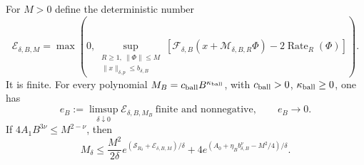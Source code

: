 \begin{proposition}
  \label{P:signed-moment-bulk-tail}
  For $M>0$ define the deterministic number
  \[
    \mathcal E_{\delta,B,M}=
    \max\left(0,\sup_{\substack{R\ge1,\ \|\Phi\|\le M\\
    \|x\|_{\delta,p}\le b_{\delta,B}}}
    [\mathcal F_{\delta,B}(x+\mathcal M_{\delta,B,R}\Phi)
    -2\operatorname{Rate}_R(\Phi)]\right).
  \]
  It is finite. For every polynomial
  $M_B=c_{\rm ball}B^{\kappa_{\rm ball}}$, with $c_{\rm ball}>0$,
  $\kappa_{\rm ball}\ge0$, one has
  \begin{equation}\label{E:signed-error-limit}
    e_B:=\limsup_{\delta\downarrow0}\mathcal E_{\delta,B,M_B}
    \ \text{finite and nonnegative},\qquad e_B\longrightarrow0 .
  \end{equation}
  If $4A_1B^{3\nu}\le M^{2-\nu}$, then
  \begin{equation}\label{E:signed-finite-moment}
    M_\delta\le
    \frac{M^2}{2\delta}
    e^{(\mathcal S_{R_\delta}+\mathcal E_{\delta,B,M})/\delta}
    +4e^{(A_0+\eta_Bb_{\delta,B}^\nu-M^2/4)/\delta}.
  \end{equation}
\end{proposition}


